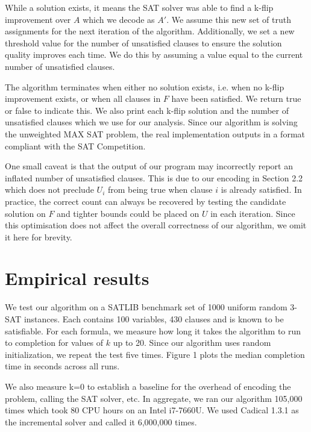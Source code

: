\documentclass{article}
\begin{document}
\noindent While a solution exists, it means the SAT solver was able to find a
k-flip improvement over $A$ which we decode as $A'$. We assume this new set of
truth assignments for the next iteration of the algorithm. Additionally, we set
a new threshold value for the number of unsatisfied clauses to ensure the
solution quality improves each time. We do this by assuming a value equal to
the current number of unsatisfied clauses.

The algorithm terminates when either no solution exists, i.e. when no k-flip
improvement exists, or when all clauses in $F$ have been satisfied. We return
true or false to indicate this. We also print each k-flip solution and the
number of unsatisfied clauses which we use for our analysis. Since our algorithm
is solving the unweighted MAX SAT problem\cite{sung2006maximum}, the real
implementation outputs in a format compliant with the SAT
Competition\cite{maxsat2020output}.

One small caveat is that the output of our program may incorrectly report an
inflated number of unsatisfied clauses. This is due to our encoding in Section
2.2 which does not preclude $U_i$ from being true when clause $i$ is already
satisfied. In practice, the correct count can always be recovered by testing
the candidate solution on $F$ and tighter bounds could be placed on $U$ in each
iteration. Since this optimisation does not affect the overall correctness of
our algorithm, we omit it here for brevity.

\break

\section{Empirical results}

We test our algorithm on a SATLIB benchmark set of 1000 uniform random 3-SAT
instances\cite{satlibproblems}. Each contains 100 variables, 430 clauses and is
known to be satisfiable. For each formula, we measure how long it takes the
algorithm to run to completion for values of $k$ up to 20. Since our algorithm
uses random initialization, we repeat the test five times. Figure 1 plots the
median completion time in seconds across all runs.

We also measure k=0 to establish a baseline for the overhead of encoding the
problem, calling the SAT solver, etc. In aggregate, we ran our algorithm 105,000
times which took 80 CPU hours on an Intel i7-7660U. We used Cadical 1.3.1 as the
incremental solver\cite{biere2017cadical} and called it 6,000,000 times. \\
\end{document}
